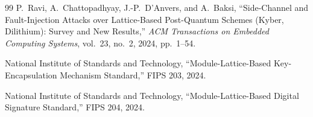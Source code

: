 \documentclass[11pt,a4paper]{article}
\begin{document}
\begin{thebibliography}{99}
P.~Ravi, A.~Chattopadhyay, J.-P.~D'Anvers, and A.~Baksi, ``Side-Channel and Fault-Injection Attacks over Lattice-Based Post-Quantum Schemes (Kyber, Dilithium): Survey and New Results,'' \emph{ACM Transactions on Embedded Computing Systems}, vol.~23, no.~2, 2024, pp.~1--54.

National Institute of Standards and Technology, ``Module-Lattice-Based Key-Encapsulation Mechanism Standard,'' FIPS 203, 2024.

National Institute of Standards and Technology, ``Module-Lattice-Based Digital Signature Standard,'' FIPS 204, 2024.

\end{thebibliography}
\end{document}
